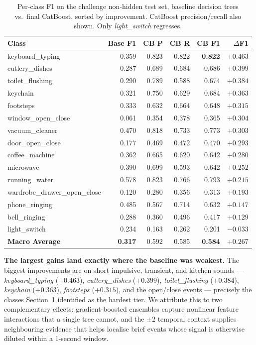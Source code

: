 \documentclass{article}
\begin{document}
\begin{table}[H]
  \caption{Per-class F1 on the challenge non-hidden test set, baseline decision trees vs.\ final CatBoost, sorted by improvement. CatBoost precision/recall also shown. Only \emph{light\_switch} regresses.}
  \label{tab:cb-compare}
  \centering
  \small
  \begin{tabular}{lrrrrr}
    \toprule
    Class & Base F1 & CB P & CB R & CB F1 & $\Delta$F1 \\
    \midrule
    keyboard\_typing            & 0.359 & 0.823 & 0.822 & \textbf{0.822} & $+0.463$ \\
    cutlery\_dishes             & 0.287 & 0.689 & 0.684 & 0.686 & $+0.399$ \\
    toilet\_flushing            & 0.290 & 0.789 & 0.588 & 0.674 & $+0.384$ \\
    keychain                    & 0.321 & 0.750 & 0.629 & 0.684 & $+0.363$ \\
    footsteps                   & 0.333 & 0.632 & 0.664 & 0.648 & $+0.315$ \\
    window\_open\_close         & 0.061 & 0.354 & 0.378 & 0.365 & $+0.304$ \\
    vacuum\_cleaner             & 0.470 & 0.818 & 0.733 & 0.773 & $+0.303$ \\
    door\_open\_close           & 0.177 & 0.469 & 0.472 & 0.470 & $+0.293$ \\
    coffee\_machine             & 0.362 & 0.665 & 0.620 & 0.642 & $+0.280$ \\
    microwave                   & 0.390 & 0.699 & 0.593 & 0.642 & $+0.252$ \\
    running\_water              & 0.578 & 0.823 & 0.766 & 0.793 & $+0.215$ \\
    wardrobe\_drawer\_open\_close & 0.120 & 0.280 & 0.356 & 0.313 & $+0.193$ \\
    phone\_ringing              & 0.485 & 0.567 & 0.714 & 0.632 & $+0.147$ \\
    bell\_ringing               & 0.288 & 0.360 & 0.496 & 0.417 & $+0.129$ \\
    light\_switch               & 0.234 & 0.163 & 0.262 & 0.201 & $-0.033$ \\
    \midrule
    \textbf{Macro Average}      & \textbf{0.317} & 0.592 & 0.585 & \textbf{0.584} & $+0.267$ \\
    \bottomrule
  \end{tabular}
\end{table}

\textbf{The largest gains land exactly where the baseline was weakest.} The biggest improvements are on short impulsive, transient, and kitchen sounds --- \emph{keyboard\_typing} ($+0.463$), \emph{cutlery\_dishes} ($+0.399$), \emph{toilet\_flushing} ($+0.384$), \emph{keychain} ($+0.363$), \emph{footsteps} ($+0.315$), and the open/close events --- precisely the classes Section~1 identified as the hardest tier. We attribute this to two complementary effects: gradient-boosted ensembles capture nonlinear feature interactions that a single tree cannot, and the $\pm2$ temporal context supplies neighbouring evidence that helps localise brief events whose signal is otherwise diluted within a 1-second window.
\end{document}
